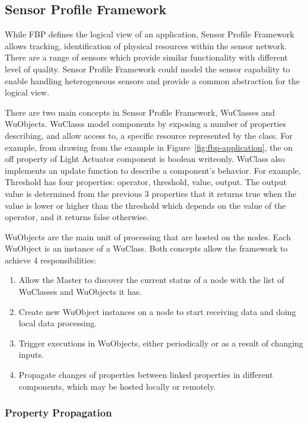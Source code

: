 \subsection{Sensor Profile Framework}

While FBP defines the logical view of an application, Sensor Profile
Framework allows tracking, identification of physical resources within the
sensor network.  There are a range of sensors which provide similar
functionality with different level of quality. Sensor Profile Framework
could model the sensor capability to enable handling heterogeneous sensors and
provide a common abstraction for the logical view.

There are two main concepts in Sensor Profile Framework, WuClasses and
WuObjects. WuClasss model components by exposing a number of properties
describing, and allow access to, a specific resource represented by the class.
For example, from drawing from the example in Figure~\ref{fig:fbp-application},
the on off property of Light Actuator component is boolean writeonly. WuClass
also implements an update function to describe a component's behavior. For
example, Threshold has four properties: operator, threshold, value, output. The
output value is determined from the previous 3 properties that it returns true
when the value is lower or higher than the threshold which depends on the value
of the operator, and it returns false otherwise.


WuObjects are the main unit of processing that are hosted on the nodes. Each
WuObject is an instance of a WuClass. Both concepts allow the framework to
achieve 4 responsibilities:
\begin{enumerate}
\item Allow the Master to discover the current status of a node with the list
of WuClasses and WuObjects it has.
\item Create new WuObject instances on a node to start receiving data and doing
local data processing.
\item Trigger executions in WuObjects, either periodically or as a result of
changing inputs.
\item Propagate changes of properties between linked properties in different
components, which may be hosted locally or remotely.
\end{enumerate}

\subsubsection{Property Propagation}


